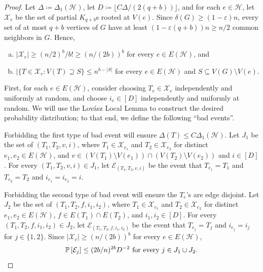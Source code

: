 \documentclass[11pt]{article}
\numberwithin{equation}{section}
\newcommand{\eps}{\varepsilon}
\newcounter{i}
\theoremstyle{plain}
\theoremstyle{plain} %
\theoremstyle{definition}
\newcommand{\cE}{\mathcal{E}}
\newcommand{\cH}{\mathcal{H}}
\newcommand{\cX}{\mathcal{X}}
\newcommand{\Prob}[1]{\ensuremath{%
\mathbb P\left[#1\right]
}}
\begin{document}
\begin{proof}
    Let $\Delta \coloneqq \Delta_1(\cH)$, let $D \coloneqq \lfloor C\Delta / (2(q + b))\rfloor$, and for each $e \in \cH$, let $\cX_e$ be the set of partial $K_{q + b}$s rooted at $V(e)$.
    Since $\delta(G) \geq (1 - \eps)n$, every set of at most $q + b$ vertices of $G$ have at least $(1 - \eps(q + b))n \geq n / 2$ common neighbors in $G$.  Hence, 
    \begin{enumerate}[(a)]
        \item\label{num-cliques-lower-bound} $|\cX_e| \geq (n/2)^{b}/b! \geq (n/ (2b))^b$ for every $e \in E(\cH)$, and 
        \item\label{num-cliques-upper-bound} $|\{T \in \cX_e : V(T) \supseteq S\} \leq n^{b-|S|}$ for every $e \in E(\cH)$ and $S \subseteq V(G)\setminus V(e)$.
    \end{enumerate}    
  
    First, for each $e \in E(\cH)$, consider choosing $T_e\in \cX_e$ independently and uniformly at random, and choose $i_e \in [D]$ independently and uniformly at random.
    We will use the Lov\'asz Local Lemma to construct the desired probability distribution; to that end, we define the following ``bad events''.  
    
    Forbidding the first type of bad event will ensure $\Delta(T) \leq C\Delta_1(\cH)$.
    Let $J_1$ be the set of $(T_1, T_2, v, i)$, where $T_1 \in \cX_{e_1}$ and $T_{2} \in \cX_{e_2}$ for distinct $e_1, e_2 \in E(\cH)$, and $v \in (V(T_1) \setminus V(e_1)) \cap (V(T_{2}) \setminus V(e_2))$ and $i \in [D]$.  For every $(T_1, T_{2}, v, i) \in J_1$, let $\cE_{(T_1, T_{2}, v, i)}$ be the event that $T_{e_1} = T_{1}$ and $T_{e_2} = T_2$ and $i_{e_1} = i_{e_2} = i$.  

    Forbidding the second type of bad event will ensure the $T_e$'s are edge disjoint.
    Let $J_2$ be the set of $(T_1, T_2, f, i_1, i_2)$, where $T_1 \in \cX_{e_1}$ and $T_2 \in \cX_{e_2}$ for distinct $e_1, e_2 \in E(\cH)$, $f \in E(T_1) \cap E(T_2)$, and $i_1,i_2\in [D]$.  For every $(T_1, T_2, f, i_1,i_2) \in J_2$, let $\cE_{(T_1,T_2,f,i_1,i_2)}$ be the event that $T_{e_j} = T_j$ and $i_{e_j} = i_j$ for $j \in \{1,2\}$.
    Since $|\cX_e| \geq (n/(2b))^{b}$ for every $e \in E(\cH)$,
    \begin{equation*}
        \Prob{\cE_j} \leq (2b / n)^{2b}D^{-2} \text{ for every } j \in J_1 \cup J_2.
    \end{equation*}
    

\end{proof}
\end{document}
